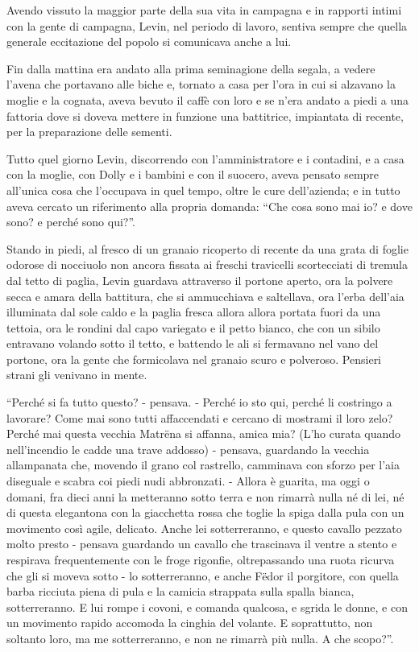 Avendo vissuto la maggior parte della sua vita in campagna e in rapporti intimi con la gente di campagna, Levin, nel periodo di lavoro, sentiva sempre che quella generale eccitazione del popolo si comunicava anche a lui. 

Fin dalla mattina era andato alla prima seminagione della segala, a vedere l'avena che portavano alle biche e, tornato a casa per l'ora in cui si alzavano la moglie e la cognata, aveva bevuto il caffè con loro e se n'era andato a piedi a una fattoria dove si doveva mettere in funzione una battitrice, impiantata di recente, per la preparazione delle sementi. 

Tutto quel giorno Levin, discorrendo con l'amministratore e i contadini, e a casa con la moglie, con Dolly e i bambini e con il suocero, aveva pensato sempre all'unica cosa che l'occupava in quel tempo, oltre le cure dell'azienda; e in tutto aveva cercato un riferimento alla propria domanda: ``Che cosa sono mai io? e dove sono? e perché sono qui?''. 

Stando in piedi, al fresco di un granaio ricoperto di recente da una grata di foglie odorose di nocciuolo non ancora fissata ai freschi travicelli scortecciati di tremula dal tetto di paglia, Levin guardava attraverso il portone aperto, ora la polvere secca e amara della battitura, che si ammucchiava e saltellava, ora l'erba dell'aia illuminata dal sole caldo e la paglia fresca allora allora portata fuori da una tettoia, ora le rondini dal capo variegato e il petto bianco, che con un sibilo entravano volando sotto il tetto, e battendo le ali si fermavano nel vano del portone, ora la gente che formicolava nel granaio scuro e polveroso. Pensieri strani gli venivano in mente. 

``Perché si fa tutto questo? - pensava. - Perché io sto qui, perché li costringo a lavorare? Come mai sono tutti affaccendati e cercano di mostrami il loro zelo? Perché mai questa vecchia Matrëna si affanna, amica mia? (L'ho curata quando nell'incendio le cadde una trave addosso) - pensava, guardando la vecchia allampanata che, movendo il grano col rastrello, camminava con sforzo per l'aia diseguale e scabra coi piedi nudi abbronzati. - Allora è guarita, ma oggi o domani, fra dieci anni la metteranno sotto terra e non rimarrà nulla né di lei, né di questa elegantona con la giacchetta rossa che toglie la spiga dalla pula con un movimento così agile, delicato. Anche lei sotterreranno, e questo cavallo pezzato molto presto - pensava guardando un cavallo che trascinava il ventre a stento e respirava frequentemente con le froge rigonfie, oltrepassando una ruota ricurva che gli si moveva sotto - lo sotterreranno, e anche Fëdor il porgitore, con quella barba ricciuta piena di pula e la camicia strappata sulla spalla bianca, sotterreranno. E lui rompe i covoni, e comanda qualcosa, e sgrida le donne, e con un movimento rapido accomoda la cinghia del volante. E soprattutto, non soltanto loro, ma me sotterreranno, e non ne rimarrà più nulla. A che scopo?''. 

